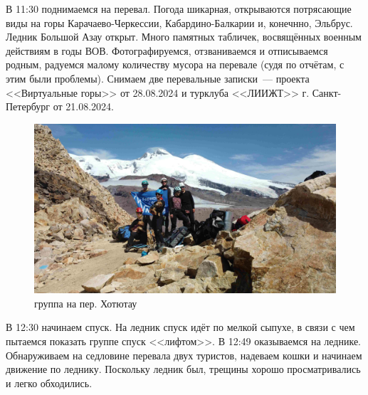 В 11:30 поднимаемся на перевал. Погода шикарная, открываются потрясающие виды на горы Карачаево-Черкессии, Кабардино-Балкарии и, конечнно, Эльбрус. Ледник Большой Азау открыт. Много памятных табличек, восвящённых военным действиям в годы ВОВ. Фотографируемся, отзваниваемся и отписываемся родным, радуемся малому количеству мусора на перевале (судя по отчётам, с этим были проблемы). Снимаем две перевальные записки~--- проекта <<Виртуальные горы>> от 28.08.2024 и турклуба <<ЛИИЖТ>> г. Санкт-Петербург от 21.08.2024.

\begin{figure}[h!]
	\centering
	\includegraphics[width=0.7\linewidth]{../pics/DJI_0899}
	\caption{группа на пер. Хотютау}
	\label{fig:hotyutau_1}
\end{figure}

В 12:30 начинаем спуск. На ледник спуск идёт по мелкой сыпухе, в связи с чем пытаемся показать группе спуск <<лифтом>>. В 12:49 оказываемся на леднике. Обнаруживаем на седловине перевала двух туристов, надеваем кошки и начинаем движение по леднику. Поскольку ледник был, трещины хорошо просматривались и легко обходились.

